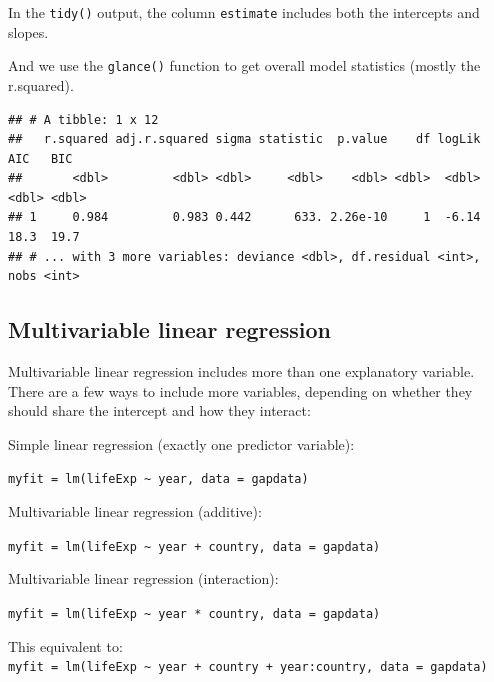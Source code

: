 \documentclass[
  12pt,
  krantz2]{krantz}
\makeatletter
\newenvironment{Shaded}{\begin{snugshade}}{\end{snugshade}}
\newcommand{\KeywordTok}[1]{\textcolor[rgb]{0.13,0.29,0.53}{\textbf{#1}}}
\newcommand{\NormalTok}[1]{#1}
\newcommand{\OperatorTok}[1]{\textcolor[rgb]{0.81,0.36,0.00}{\textbf{#1}}}
\newcommand{\StringTok}[1]{\textcolor[rgb]{0.31,0.60,0.02}{#1}}
\newenvironment{kframe}{%
\medskip{}
\setlength{\fboxsep}{.8em}
 \def\at@end@of@kframe{}%
 \ifinner\ifhmode%
  \def\at@end@of@kframe{\end{minipage}}%
  \begin{minipage}{\columnwidth}%
 \fi\fi%
 \def\FrameCommand##1{\hskip\@totalleftmargin \hskip-\fboxsep
 \colorbox{shadecolor}{##1}\hskip-\fboxsep
     \hskip-\linewidth \hskip-\@totalleftmargin \hskip\columnwidth}%
 \MakeFramed {\advance\hsize-\width
   \@totalleftmargin\z@ \linewidth\hsize
   \@setminipage}}%
 {\par\unskip\endMakeFramed%
 \at@end@of@kframe}
\renewenvironment{Shaded}{\begin{kframe}}{\end{kframe}}
\makeatother
\begin{document}
In the \texttt{tidy()} output, the column \texttt{estimate} includes both the intercepts and slopes.

And we use the \texttt{glance()} function to get overall model statistics (mostly the r.squared).

\begin{Shaded}
\end{Shaded}

\begin{verbatim}
## # A tibble: 1 x 12
##   r.squared adj.r.squared sigma statistic  p.value    df logLik   AIC   BIC
##       <dbl>         <dbl> <dbl>     <dbl>    <dbl> <dbl>  <dbl> <dbl> <dbl>
## 1     0.984         0.983 0.442      633. 2.26e-10     1  -6.14  18.3  19.7
## # ... with 3 more variables: deviance <dbl>, df.residual <int>, nobs <int>
\end{verbatim}

\hypertarget{multivariable-linear-regression}{%
\subsection{Multivariable linear regression}\label{multivariable-linear-regression}}


Multivariable linear regression includes more than one explanatory variable.
There are a few ways to include more variables, depending on whether they should share the intercept and how they interact:

Simple linear regression (exactly one predictor variable):

\texttt{myfit\ =\ lm(lifeExp\ \textasciitilde{}\ year,\ data\ =\ gapdata)}

Multivariable linear regression (additive):

\texttt{myfit\ =\ lm(lifeExp\ \textasciitilde{}\ year\ +\ country,\ data\ =\ gapdata)}

Multivariable linear regression (interaction):

\texttt{myfit\ =\ lm(lifeExp\ \textasciitilde{}\ year\ *\ country,\ data\ =\ gapdata)}

This equivalent to:
\texttt{myfit\ =\ lm(lifeExp\ \textasciitilde{}\ year\ +\ country\ +\ year:country,\ data\ =\ gapdata)}
\end{document}
